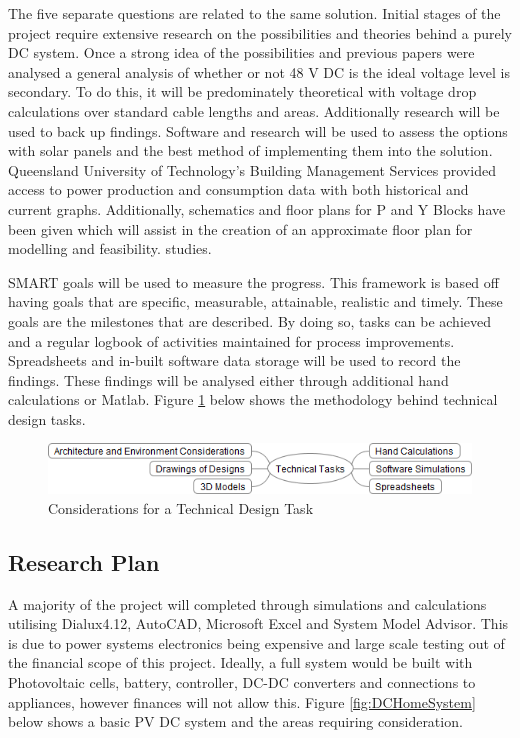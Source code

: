 The five separate questions are related to the same solution. Initial stages of the project require extensive research on the possibilities and theories behind a purely DC system. Once a strong idea of the possibilities and previous papers were analysed a general analysis of whether or not 48 V DC is the ideal voltage level is secondary. To do this, it will be predominately theoretical with voltage drop calculations over standard cable lengths and areas. Additionally research will be used to back up findings. Software and research will be used to assess the options with solar panels and the best method of implementing them into the solution. Queensland University of Technology's Building Management Services provided access to power production and consumption data with both historical and current graphs. Additionally, schematics and floor plans for P and Y Blocks have been given which will assist in the creation of an approximate floor plan for modelling and feasibility. studies.   
\newline

SMART goals will be used to measure the progress. This framework is based off having goals that are specific, measurable, attainable, realistic and timely. These goals are the milestones that are described. By doing so, tasks can be achieved and a regular logbook of activities maintained for process improvements. Spreadsheets and in-built software data storage will be used to record the findings. These findings will be analysed either through additional hand calculations or Matlab. Figure \ref{fig:PracProcedure} below shows the methodology behind technical design tasks.    

\begin{figure}[H]
\hfill\includegraphics[width = 160mm]{images/Practical_Planning_Rev2}\hspace*{\fill}
\caption{Considerations for a Technical Design Task}
\label{fig:PracProcedure}
\end{figure}     

\newpage

\subsection{Research Plan}

A majority of the project will completed through simulations and calculations utilising Dialux4.12, AutoCAD, Microsoft Excel and System Model Advisor. This is due to power systems electronics being expensive and large scale testing out of the financial scope of this project. Ideally, a full system would be built with Photovoltaic cells, battery, controller, DC-DC converters and connections to appliances, however finances will not allow this. Figure \ref{fig:DCHomeSystem} below shows a basic PV DC system and the areas requiring consideration. 
\newline

